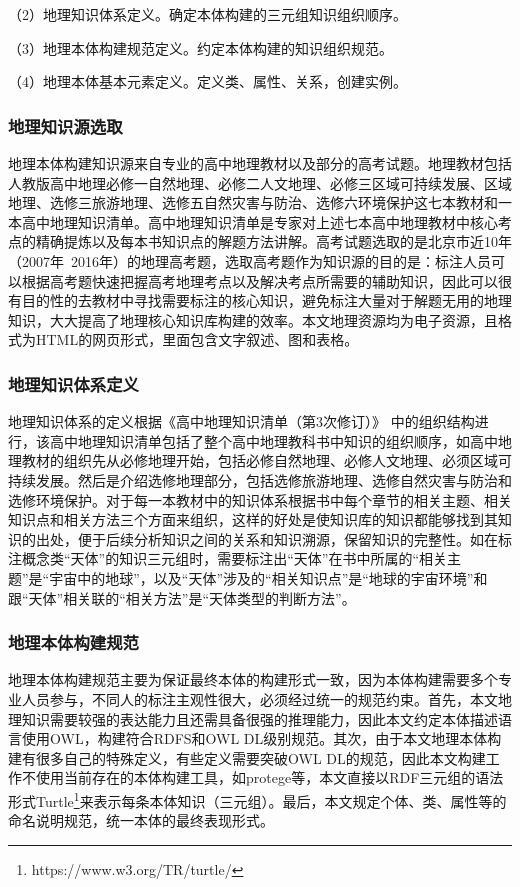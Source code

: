 （2）地理知识体系定义。确定本体构建的三元组知识组织顺序。

（3）地理本体构建规范定义。约定本体构建的知识组织规范。

（4）地理本体基本元素定义。定义类、属性、关系，创建实例。

\subsubsection{地理知识源选取}
地理本体构建知识源来自专业的高中地理教材以及部分的高考试题。地理教材包括人教版高中地理必修一自然地理、必修二人文地理、必修三区域可持续发展、区域地理、选修三旅游地理、选修五自然灾害与防治、选修六环境保护这七本教材和一本高中地理知识清单。高中地理知识清单是专家对上述七本高中地理教材中核心考点的精确提炼以及每本书知识点的解题方法讲解。高考试题选取的是北京市近10年（2007年~2016年）的地理高考题，选取高考题作为知识源的目的是：标注人员可以根据高考题快速把握高考地理考点以及解决考点所需要的辅助知识，因此可以很有目的性的去教材中寻找需要标注的核心知识，避免标注大量对于解题无用的地理知识，大大提高了地理核心知识库构建的效率。本文地理资源均为电子资源，且格式为HTML的网页形式，里面包含文字叙述、图和表格。

\subsubsection{地理知识体系定义}
地理知识体系的定义根据《高中地理知识清单（第3次修订）》
中的组织结构进行，该高中地理知识清单包括了整个高中地理教科书中知识的组织顺序，如高中地理教材的组织先从必修地理开始，包括必修自然地理、必修人文地理、必须区域可持续发展。然后是介绍选修地理部分，包括选修旅游地理、选修自然灾害与防治和选修环境保护。对于每一本教材中的知识体系根据书中每个章节的相关主题、相关知识点和相关方法三个方面来组织，这样的好处是使知识库的知识都能够找到其知识的出处，便于后续分析知识之间的关系和知识溯源，保留知识的完整性。如在标注概念类“天体”的知识三元组时，需要标注出“天体”在书中所属的“相关主题”是“宇宙中的地球”，以及“天体”涉及的“相关知识点”是“地球的宇宙环境”和跟“天体”相关联的“相关方法”是“天体类型的判断方法”。

\subsubsection{地理本体构建规范}
地理本体构建规范主要为保证最终本体的构建形式一致，因为本体构建需要多个专业人员参与，不同人的标注主观性很大，必须经过统一的规范约束。首先，本文地理知识需要较强的表达能力且还需具备很强的推理能力，因此本文约定本体描述语言使用OWL，构建符合RDFS和OWL DL级别规范。其次，由于本文地理本体构建有很多自己的特殊定义，有些定义需要突破OWL DL的规范，因此本文构建工作不使用当前存在的本体构建工具，如protege等，本文直接以RDF三元组的语法形式Turtle\footnote{https://www.w3.org/TR/turtle/}来表示每条本体知识（三元组）。最后，本文规定个体、类、属性等的命名说明规范，统一本体的最终表现形式。

